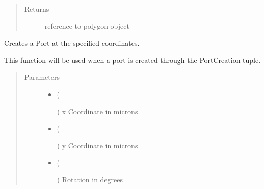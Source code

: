 \documentclass[a4paper,10pt,english]{sphinxmanual}
\begin{document}
\begin{fulllineitems}
\begin{fulllineitems}
\begin{quote}
\begin{description}
\begin{itemize}
\end{itemize}

\item[{Returns}] \leavevmode
reference to polygon object

\end{description}\end{quote}

\end{fulllineitems}


\begin{fulllineitems}
\label{\detokenize{photonics:photonics.PhotDevice.create_port}}
Creates a Port at the specified coordinates.

This function will be used when a port is created through the PortCreation tuple.
\begin{quote}\begin{description}
\item[{Parameters}] \leavevmode\begin{itemize}
\item {} 
 (%
\begin{footnote}[50]\sphinxAtStartFootnote
{}
%
\end{footnote}) \textendash{} x Coordinate in microns

\item {} 
 (%
\begin{footnote}[51]\sphinxAtStartFootnote
{}
%
\end{footnote}) \textendash{} y Coordinate in microns

\item {} 
 (%
\begin{footnote}[52]\sphinxAtStartFootnote
{}
%
\end{footnote}) \textendash{} Rotation in degrees


\end{itemize}
\end{description}
\end{quote}
\end{fulllineitems}
\end{fulllineitems}
\end{document}
